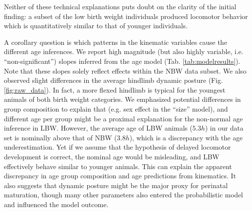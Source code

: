 Neither of these technical explanations puts doubt on the clarity of the initial finding: a subset of the low birth weight individuals produced locomotor behavior which is quantitatively similar to that of younger individuals.



A corollary question is which patterns in the kinematic variables cause the different age inferences.
We report high magnitude (but also highly variable, i.e. ``non-significant'') slopes inferred from the age model (Tab. \ref{tab:modelresults}).
Note that these slopes solely reflect effects within the NBW data subset.
We also observed slight differences in the average hindlimb dynamic posture (Fig. \ref{fig:raw_data}).
In fact, a more flexed hindlimb is typical for the youngest animals of both birth weight categories.
We emphasized potential differences in group composition to explain that (e.g. sex effect in the ``size'' model), and different age per group might be a proximal explanation for the non-normal age inference in LBW.
However, the average age of LBW animals (\(5.3 h\)) in our data set is nominally above that of NBW (\(3.8 h\)), which is a discrepancy with the age underestimation.
Yet if we assume that the hypothesis of delayed locomotor development is correct, the nominal age would be misleading, and LBW effectively behave similar to younger animals.
This can explain the apparent discrepancy in age group composition and age predictions from kinematics.
It also suggests that dynamic posture might be the major proxy for perinatal maturation, though many other parameters also entered the probabilistic model and influenced the model outcome.


\bigskip

